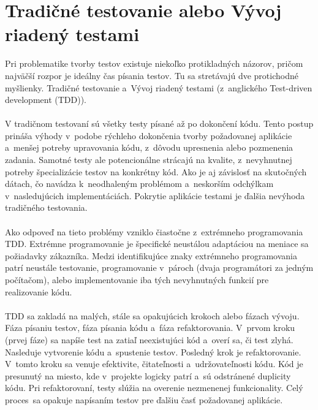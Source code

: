 \documentclass[
  printed, %
  table,   %
oneside,
  nolof,     %
  nolot,     %
]{fithesis3}
\begin{document}
\section{Tradičné testovanie alebo Vývoj riadený testami}

Pri problematike tvorby testov existuje niekoľko protikladných názorov, pričom najväčší rozpor je ideálny čas písania testov. Tu sa stretávajú dve protichodné myšlienky. Tradičné testovanie a~Vývoj riadený testami (z~anglického  Test-driven development (TDD))\cite{softwareTesting}. \paragraph{}
V tradičnom testovaní sú všetky testy písané až po dokončení kódu. Tento postup prináša výhody v~podobe rýchleho dokončenia tvorby požadovanej aplikácie a~menšej potreby upravovania kódu, z~dôvodu upresnenia alebo pozmenenia zadania.
Samotné testy ale potencionálne strácajú na kvalite, z~nevyhnutnej  potreby špecializácie testov na konkrétny kód. Ako je aj závislosť na skutočných dátach, čo navádza k~neodhaleným problémom a~neskorším odchýlkam v~nasledujúcich implementáciách. Pokrytie aplikácie testami je ďalšia nevýhoda tradičného testovania.  \paragraph{}
Ako odpoveď na tieto problémy vzniklo čiastočne z~extrémneho programovania TDD. Extrémne programovanie je špecifické neustálou adaptáciou na meniace sa  požiadavky zákazníka. Medzi identifikujúce znaky extrémneho programovania patrí neustále testovanie, programovanie v~pároch (dvaja programátori za jedným počítačom), alebo implementovanie  iba tých nevyhnutných funkcií pre realizovanie kódu. \paragraph{}
TDD sa zakladá na malých, stále sa opakujúcich krokoch alebo fázach vývoju. Fáza písaniu testov, fáza písania kódu a~fáza refaktorovania.
V~prvom kroku (prvej fáze) sa napíše test na zatiaľ neexistujúci kód a~overí sa, či test zlyhá. Nasleduje vytvorenie kódu a~spustenie testov. Posledný krok je refaktorovanie. V~tomto kroku sa venuje efektivite, čitateľnosti a~udržovateľnosti kódu. Kód je presunutý na miesto, kde v~projekte logicky patrí a~sú odstránené duplicity kódu. Pri refaktorovaní, testy slúžia na overenie nezmenenej funkcionality. Celý proces~sa opakuje napísaním testov pre ďalšiu časť požadovanej aplikácie.
\end{document}
